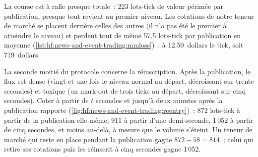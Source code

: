 La course est à rafle presque totale~: 223 lots-tick de valeur périmée par publication, presque tout revient au premier niveau. Les cotations de notre teneur de marché se placent derrière
celles des autres (il n'a pas été le premier à atteindre le niveau) et perdent tout de même 57.5 lots-tick par publication en moyenne (\cref{lst:hf:news-and-event-trading:mmloss})~: à 12.50~dollars le
tick, soit 719~dollars.

La seconde moitié du protocole concerne la réinscription. Après la publication, le flux est dense (vingt et une fois le niveau normal au départ, décroissant sur trente secondes) et
toxique (un mark-out de trois ticks au départ, décroissant sur cinq secondes). Coter à partir de $t$ secondes et jusqu'à deux minutes après la publication rapporte
(\cref{fig:hf:news-and-event-trading:reentry})~: 872 lots-tick à partir de la publication elle-même, 911 à partir d'une demi-seconde, 1\,052 à partir de cinq secondes, et moins
au-delà, à mesure que le volume s'éteint. Un teneur de marché qui reste en place pendant la publication gagne $872-58=814$~; celui qui retire ses cotations puis les réinscrit à cinq secondes gagne
1\,052.

\begin{omfigure}

\label{fig:hf:news-and-event-trading:reentry}
\end{omfigure}

